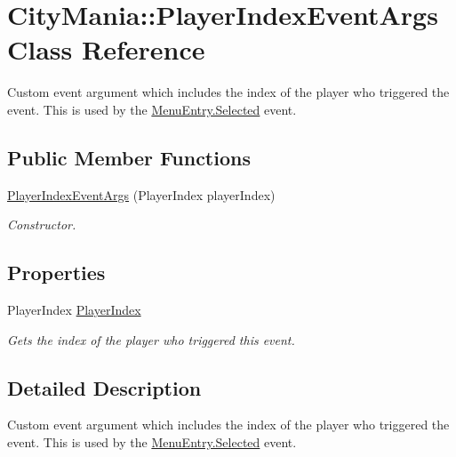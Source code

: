 \hypertarget{classCityMania_1_1PlayerIndexEventArgs}{
\section{CityMania::PlayerIndexEventArgs Class Reference}
\label{classCityMania_1_1PlayerIndexEventArgs}
}


Custom event argument which includes the index of the player who triggered the event. This is used by the \hyperlink{classCityMania_1_1MenuEntry_a936e132fbdf1e2e598b82ef1b022f96c}{MenuEntry.Selected} event.  
\subsection*{Public Member Functions}
\begin{DoxyCompactItemize}
\item 
\hyperlink{classCityMania_1_1PlayerIndexEventArgs_a757c1fc60252c4cc20edae69096457db}{PlayerIndexEventArgs} (PlayerIndex playerIndex)
\begin{DoxyCompactList}\small\item\em Constructor. \item\end{DoxyCompactList}\end{DoxyCompactItemize}
\subsection*{Properties}
\begin{DoxyCompactItemize}
\item 
PlayerIndex \hyperlink{classCityMania_1_1PlayerIndexEventArgs_a72cd86631ece70939ee5e6acd7a8303d}{PlayerIndex}
\begin{DoxyCompactList}\small\item\em Gets the index of the player who triggered this event. \item\end{DoxyCompactList}\end{DoxyCompactItemize}


\subsection{Detailed Description}
Custom event argument which includes the index of the player who triggered the event. This is used by the \hyperlink{classCityMania_1_1MenuEntry_a936e132fbdf1e2e598b82ef1b022f96c}{MenuEntry.Selected} event. 

